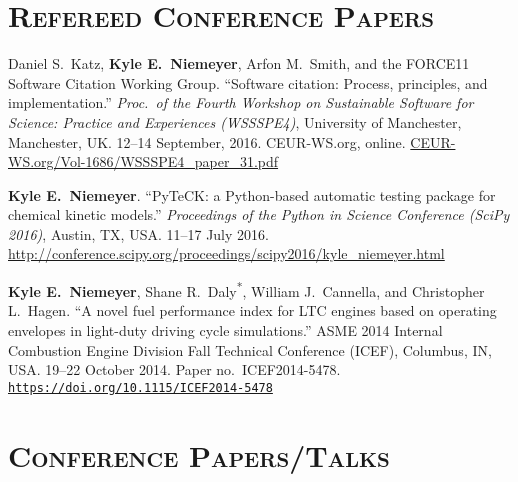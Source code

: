 \documentclass[margin,line,11pt]{res}
\makeatletter
\newlength{\bibhang}
\newlength{\bibsep}
 {\@listi \global\bibsep\itemsep \global\advance\bibsep by\parsep}
\newenvironment{bibenum*}
  {\renewcommand\labelenumi{\theenumi.}%
   \etaremune[
     topsep=0pt,
     itemsep=\bibsep,
     parsep=0pt,partopsep=0pt,
     itemindent=-\bibhang,
     leftmargin={\bibhang+\widthof{[999]}}]}
  {\endetaremune}
\newcommand*{\doi}[1]{\href{https://doi.org/#1}{\nolinkurl{https://doi.org/#1}}}
\makeatother
\begin{document}
\begin{resume}
\begin{bibenum*}
\end{bibenum*}

\section{\textsc{Refereed Conference Papers}}

\begin{bibenum*}

\item Daniel S.\ Katz, \textbf{Kyle E.~Niemeyer}, Arfon M.\ Smith, and the FORCE11 Software Citation Working Group.
``Software citation: Process, principles, and implementation.''
\emph{Proc.\ of the Fourth Workshop on Sustainable Software for Science: Practice and Experiences (WSSSPE4)},
University of Manchester, Manchester, UK.
12--14 September, 2016.
CEUR-WS.org, online.
\href{http://ceur-ws.org/Vol-1686/WSSSPE4_paper_31.pdf}{CEUR-WS.org/Vol-1686/WSSSPE4\_paper\_31.pdf}

\item \textbf{Kyle E.~Niemeyer}.
``PyTeCK: a Python-based automatic testing package for chemical kinetic models.''
\emph{Proceedings of the  Python in Science Conference (SciPy 2016)},
Austin, TX, USA.
11--17 July 2016.
\url{http://conference.scipy.org/proceedings/scipy2016/kyle_niemeyer.html}

\item \textbf{Kyle E.~Niemeyer}, Shane R.\ Daly\textsuperscript{*}, William J.\ Cannella, and Christopher L.\ Hagen.
``A novel fuel performance index for LTC engines based on operating envelopes in light-duty driving cycle simulations.''
ASME 2014 Internal Combustion Engine Division Fall Technical Conference (ICEF), Columbus, IN, USA.
19--22 October 2014.
Paper no.~ICEF2014-5478.
\doi{10.1115/ICEF2014-5478}

\end{bibenum*}

\section{\textsc{Conference Papers\slash Talks}}

\begin{bibenum*}


\end{bibenum*}
\end{resume}
\end{document}
